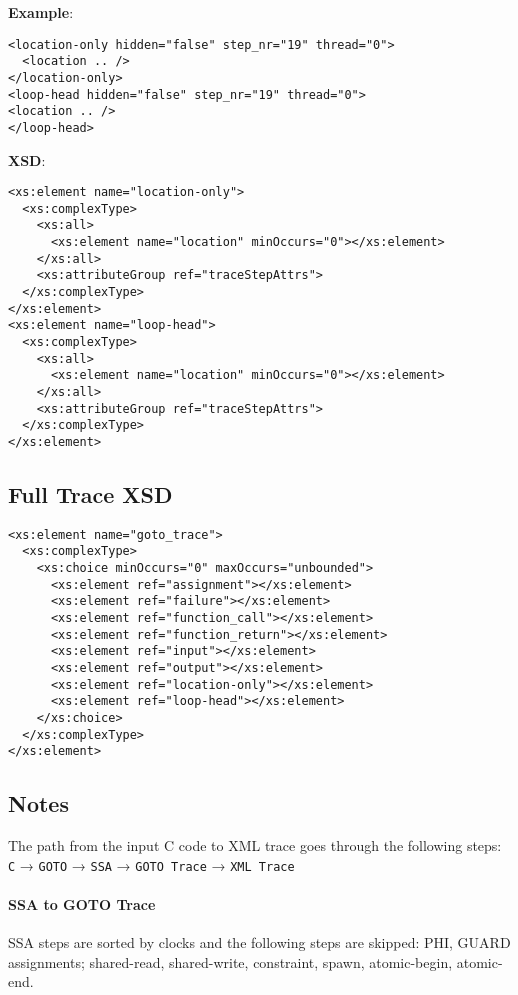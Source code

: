 \documentclass[12pt]{article}
\begin{document}
\noindent\textbf{Example}:
\begin{verbatim}
<location-only hidden="false" step_nr="19" thread="0">
  <location .. />
</location-only>
<loop-head hidden="false" step_nr="19" thread="0">
<location .. />
</loop-head>
\end{verbatim}

\noindent\textbf{XSD}:
\begin{verbatim}
<xs:element name="location-only">
  <xs:complexType>
    <xs:all>
      <xs:element name="location" minOccurs="0"></xs:element>
    </xs:all>
    <xs:attributeGroup ref="traceStepAttrs">
  </xs:complexType>
</xs:element>
<xs:element name="loop-head">
  <xs:complexType>
    <xs:all>
      <xs:element name="location" minOccurs="0"></xs:element>
    </xs:all>
    <xs:attributeGroup ref="traceStepAttrs">
  </xs:complexType>
</xs:element>
\end{verbatim}

\subsection{Full Trace XSD}

\begin{verbatim}
<xs:element name="goto_trace">
  <xs:complexType>
    <xs:choice minOccurs="0" maxOccurs="unbounded">
      <xs:element ref="assignment"></xs:element>
      <xs:element ref="failure"></xs:element>
      <xs:element ref="function_call"></xs:element>
      <xs:element ref="function_return"></xs:element>
      <xs:element ref="input"></xs:element>
      <xs:element ref="output"></xs:element>
      <xs:element ref="location-only"></xs:element>
      <xs:element ref="loop-head"></xs:element>
    </xs:choice>
  </xs:complexType>
</xs:element>
\end{verbatim}

\subsection{Notes}

The path from the input C code to XML trace goes through the following steps:\\

\texttt{C} → \texttt{GOTO} → \texttt{SSA} → \texttt{GOTO Trace} → \texttt{XML Trace}

\paragraph{SSA to GOTO Trace}

SSA steps are sorted by clocks and the following steps are skipped: PHI, GUARD
assignments; shared-read, shared-write, constraint, spawn, atomic-begin,
atomic-end.
\end{document}
